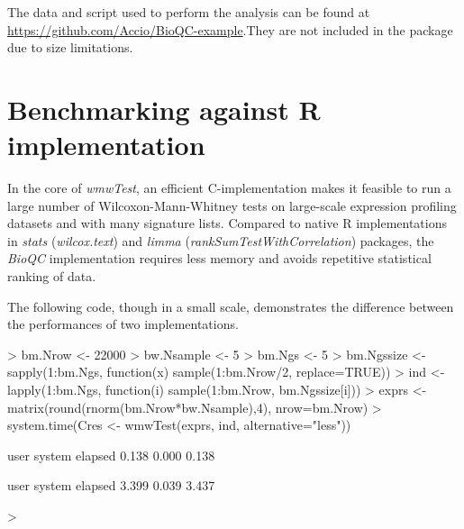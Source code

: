 \documentclass[11pt]{article}
\begin{document}
The data and script used to perform the analysis can be found at \url{https://github.com/Accio/BioQC-example}.They are not included in the package due to size limitations.

\section{Benchmarking against R implementation}
In the core of \textit{wmwTest}, an efficient C-implementation makes it feasible to run a large number of Wilcoxon-Mann-Whitney tests on large-scale expression profiling datasets and with many signature lists. Compared to native R implementations in \textit{stats} (\textit{wilcox.text}) and \textit{limma} (\textit{rankSumTestWithCorrelation}) packages, the \textit{BioQC} implementation requires less memory and avoids repetitive statistical ranking of data.

The following code, though in a small scale, demonstrates the difference between the performances of two implementations. 

\begin{Schunk}
\begin{Sinput}
> bm.Nrow <- 22000
> bw.Nsample <- 5
> bm.Ngs <- 5
> bm.Ngssize <- sapply(1:bm.Ngs, function(x) sample(1:bm.Nrow/2, replace=TRUE))
> ind <- lapply(1:bm.Ngs, function(i) sample(1:bm.Nrow, bm.Ngssize[i]))
> exprs <- matrix(round(rnorm(bm.Nrow*bw.Nsample),4), nrow=bm.Nrow)
> system.time(Cres <- wmwTest(exprs, ind, alternative="less"))
\end{Sinput}
\begin{Soutput}
   user  system elapsed 
  0.138   0.000   0.138 
\end{Soutput}
\begin{Soutput}
   user  system elapsed 
  3.399   0.039   3.437 
\end{Soutput}
\begin{Sinput}
> 
\end{Sinput}
\end{Schunk}
\end{document}
